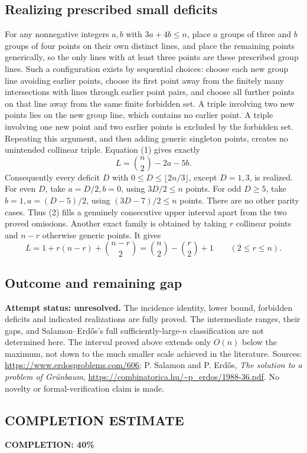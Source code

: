 \subsection*{Realizing prescribed small deficits}
For any nonnegative integers $a,b$ with $3a+4b\leq n$, place $a$ groups of three and $b$ groups of four points on their own distinct lines, and place the remaining points generically, so the only lines with at least three points are these prescribed group lines. Such a configuration exists by sequential choices: choose each new group line avoiding earlier points, choose its first point away from the finitely many intersections with lines through earlier point pairs, and choose all further points on that line away from the same finite forbidden set. A triple involving two new points lies on the new group line, which contains no earlier point. A triple involving one new point and two earlier points is excluded by the forbidden set. Repeating this argument, and then adding generic singleton points, creates no unintended collinear triple.
Equation (1) gives exactly
\[L=\binom n2-2a-5b.\tag{2}
\]
Consequently every deficit $D$ with $0\leq D\leq\lfloor2n/3\rfloor$, except $D=1,3$, is realized. For even $D$, take $a=D/2,b=0$, using $3D/2\leq n$ points. For odd $D\geq5$, take $b=1,a=(D-5)/2$, using $(3D-7)/2\leq n$ points. There are no other parity cases. Thus (2) fills a genuinely consecutive upper interval apart from the two proved omissions.
Another exact family is obtained by taking $r$ collinear points and $n-r$ otherwise generic points. It gives
\[L=1+r(n-r)+\binom{n-r}{2}
=\binom n2-\binom r2+1\qquad(2\leq r\leq n).
\]

\subsection*{Outcome and remaining gap}
\textbf{Attempt status: unresolved.} The incidence identity, lower bound, forbidden deficits and indicated realizations are fully proved. The intermediate ranges, their gaps, and Salamon--Erd\H{o}s's full sufficiently-large-$n$ classification are not determined here. The interval proved above extends only $O(n)$ below the maximum, not down to the much smaller scale achieved in the literature.
Sources: \url{https://www.erdosproblems.com/606}; P. Salamon and P. Erd\H{o}s, \emph{The solution to a problem of Gr\"unbaum}, \url{https://combinatorica.hu/~p_erdos/1988-36.pdf}. No novelty or formal-verification claim is made.

\subsection*{COMPLETION ESTIMATE}
\textbf{COMPLETION: 40\%}
